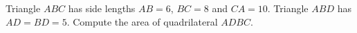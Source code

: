 Triangle $ABC$ has side lengths $AB=6$, $BC=8$ and $CA=10$. Triangle $ABD$ has $AD=BD=5$. Compute the area of quadrilateral $ADBC$.
